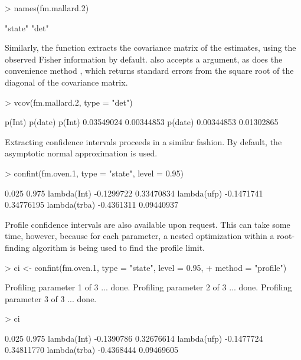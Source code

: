 \documentclass[article,shortnames]{jss}
\begin{document}
{\begin{Schunk}
\begin{Sinput}
> names(fm.mallard.2)
\end{Sinput}
\begin{Soutput}
[1] "state" "det"  
\end{Soutput}
\end{Schunk}

Similarly, the  function extracts the covariance matrix of
the estimates, using the observed Fisher information by default. 
also accepts a  argument, as does the convenience method
, which returns standard errors from the square root of the diagonal
of the covariance matrix.

\begin{Schunk}
\begin{Sinput}
> vcov(fm.mallard.2, type = "det")
\end{Sinput}
\begin{Soutput}
            p(Int)    p(date)
p(Int)  0.03549024 0.00344853
p(date) 0.00344853 0.01302865
\end{Soutput}
\end{Schunk}

Extracting confidence intervals proceeds in a similar
fashion.  By default, the asymptotic normal approximation is used.

\begin{Schunk}
\begin{Sinput}
> confint(fm.oven.1, type = "state", level = 0.95)
\end{Sinput}
\begin{Soutput}
                  0.025      0.975
lambda(Int)  -0.1299722 0.33470834
lambda(ufp)  -0.1471741 0.34776195
lambda(trba) -0.4361311 0.09440937
\end{Soutput}
\end{Schunk}

Profile confidence intervals are also available upon request.  This
can take some time, however, because for each parameter, a nested
optimization within a root-finding algorithm is being used to find the
profile limit.

\begin{Schunk}
\begin{Sinput}
> ci <- confint(fm.oven.1, type = "state", level = 0.95, 
+     method = "profile")
\end{Sinput}
\begin{Soutput}
Profiling parameter 1 of 3 ... done.
Profiling parameter 2 of 3 ... done.
Profiling parameter 3 of 3 ... done.
\end{Soutput}
\end{Schunk}
\begin{Schunk}
\begin{Sinput}
> ci
\end{Sinput}
\begin{Soutput}
                  0.025      0.975
lambda(Int)  -0.1390786 0.32676614
lambda(ufp)  -0.1477724 0.34811770
lambda(trba) -0.4368444 0.09469605
\end{Soutput}
\end{Schunk}

}
\end{document}
